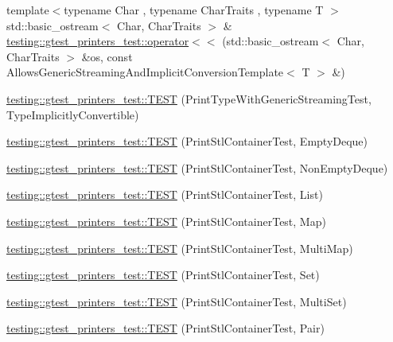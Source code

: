 \begin{DoxyCompactItemize}
\item 
{\footnotesize template$<$typename Char , typename Char\+Traits , typename T $>$ }\\std\+::basic\+\_\+ostream$<$ Char, Char\+Traits $>$ \& \hyperlink{namespacetesting_1_1gtest__printers__test_a09eedfbca613302efe6438d2a537f419}{testing\+::gtest\+\_\+printers\+\_\+test\+::operator$<$$<$} (std\+::basic\+\_\+ostream$<$ Char, Char\+Traits $>$ \&os, const Allows\+Generic\+Streaming\+And\+Implicit\+Conversion\+Template$<$ T $>$ \&)
\item 
\hyperlink{namespacetesting_1_1gtest__printers__test_a68877c5e1ec7a53281798310c30e1776}{testing\+::gtest\+\_\+printers\+\_\+test\+::\+T\+E\+ST} (Print\+Type\+With\+Generic\+Streaming\+Test, Type\+Implicitly\+Convertible)
\item 
\hyperlink{namespacetesting_1_1gtest__printers__test_a1ce10b8a3634e0f6bfbfbb5888c04a95}{testing\+::gtest\+\_\+printers\+\_\+test\+::\+T\+E\+ST} (Print\+Stl\+Container\+Test, Empty\+Deque)
\item 
\hyperlink{namespacetesting_1_1gtest__printers__test_a249d482cf4a1525bd043489dcbd3e200}{testing\+::gtest\+\_\+printers\+\_\+test\+::\+T\+E\+ST} (Print\+Stl\+Container\+Test, Non\+Empty\+Deque)
\item 
\hyperlink{namespacetesting_1_1gtest__printers__test_aaa135672ff79ecaef82c6046f2ab8d29}{testing\+::gtest\+\_\+printers\+\_\+test\+::\+T\+E\+ST} (Print\+Stl\+Container\+Test, List)
\item 
\hyperlink{namespacetesting_1_1gtest__printers__test_a3d701a1866f260a42411e9041894c49c}{testing\+::gtest\+\_\+printers\+\_\+test\+::\+T\+E\+ST} (Print\+Stl\+Container\+Test, Map)
\item 
\hyperlink{namespacetesting_1_1gtest__printers__test_a8a498c956a5b1c0358d126e1ad56fac0}{testing\+::gtest\+\_\+printers\+\_\+test\+::\+T\+E\+ST} (Print\+Stl\+Container\+Test, Multi\+Map)
\item 
\hyperlink{namespacetesting_1_1gtest__printers__test_abdc498462741033074f8e86b7c0bd480}{testing\+::gtest\+\_\+printers\+\_\+test\+::\+T\+E\+ST} (Print\+Stl\+Container\+Test, Set)
\item 
\hyperlink{namespacetesting_1_1gtest__printers__test_adaa3e1cfa3feca377b3958edb41fc0f1}{testing\+::gtest\+\_\+printers\+\_\+test\+::\+T\+E\+ST} (Print\+Stl\+Container\+Test, Multi\+Set)
\item 
\hyperlink{namespacetesting_1_1gtest__printers__test_ad5d3e873b00c1c9e3f5924e106dd7831}{testing\+::gtest\+\_\+printers\+\_\+test\+::\+T\+E\+ST} (Print\+Stl\+Container\+Test, Pair)

\end{DoxyCompactItemize}
